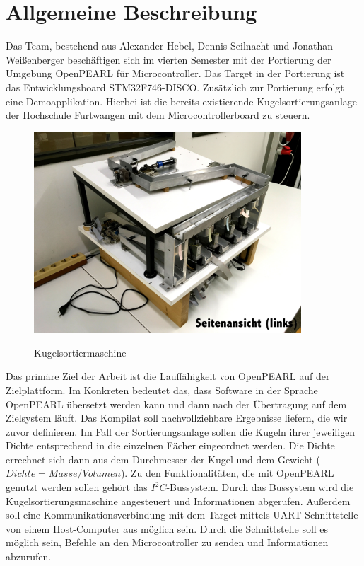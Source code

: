 \chapter{Allgemeine Beschreibung}
Das Team, bestehend aus Alexander Hebel, Dennis Seilnacht und Jonathan Weißenberger beschäftigen sich im vierten Semester mit der Portierung der Umgebung OpenPEARL für Microcontroller. Das Target in der Portierung ist das Entwicklungsboard STM32F746-DISCO. Zusätzlich zur Portierung erfolgt eine Demoapplikation. Hierbei ist die bereits existierende Kugelsortierungsanlage der Hochschule Furtwangen mit dem Microcontrollerboard zu steuern.
\begin{figure}[h]
\begin{center}
\includegraphics[width=10cm]{grafiken/Seitenansicht.jpg}
\label{bild_kugelsortiermaschine}
\caption{Kugelsortiermaschine}
\end{center}
\end{figure}
Das primäre Ziel der Arbeit ist die Lauffähigkeit von OpenPEARL auf der Zielplattform. Im Konkreten bedeutet das, dass Software in der Sprache OpenPEARL übersetzt werden kann und dann nach der Übertragung auf dem Zielsystem läuft. Das Kompilat soll nachvollziehbare Ergebnisse liefern, die wir zuvor definieren. Im Fall der Sortierungsanlage sollen die Kugeln ihrer jeweiligen Dichte entsprechend in die einzelnen Fächer eingeordnet werden. Die Dichte errechnet sich dann aus dem Durchmesser der Kugel und dem Gewicht ($Dichte=Masse/Volumen$). Zu den Funktionalitäten, die mit OpenPEARL genutzt werden sollen gehört das $I^2C$-Bussystem. Durch das Bussystem wird die Kugelsortierungsmaschine angesteuert und Informationen abgerufen. Außerdem soll eine Kommunikationsverbindung mit dem Target mittels UART-Schnittstelle von einem Host-Computer aus möglich sein. Durch die Schnittstelle soll es möglich sein, Befehle an den Microcontroller zu senden und Informationen abzurufen. 

